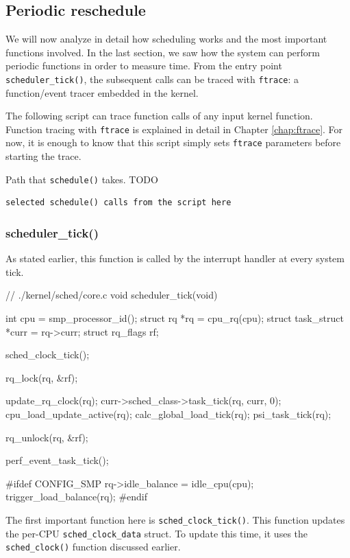 \subsection{Periodic reschedule}
We will now analyze in detail how scheduling works and the most important functions involved. In the last section, we saw how the system can perform periodic functions in order to measure time. From the entry point \verb|scheduler_tick()|, the subsequent calls can be traced with \verb|ftrace|: a function/event tracer embedded in the kernel.

The following script can trace function calls of any input kernel function. Function tracing with \verb|ftrace| is explained in detail in Chapter \ref{chap:ftrace}. For now, it is enough to know that this script simply sets \verb|ftrace| parameters before starting the trace. 

Path that \verb|schedule()| takes. TODO
\begin{Verbatim}
selected schedule() calls from the script here
\end{Verbatim}

\subsubsection{scheduler\_tick()}
As stated earlier, this function is called by the interrupt handler at every system tick.

\begin{code}
// ./kernel/sched/core.c
void scheduler_tick(void)
{
	int cpu = smp_processor_id();
	struct rq *rq = cpu_rq(cpu);
	struct task_struct *curr = rq->curr;
	struct rq_flags rf;

	sched_clock_tick();

	rq_lock(rq, &rf);

	update_rq_clock(rq);
	curr->sched_class->task_tick(rq, curr, 0);
	cpu_load_update_active(rq);
	calc_global_load_tick(rq);
	psi_task_tick(rq);

	rq_unlock(rq, &rf);

	perf_event_task_tick();

#ifdef CONFIG_SMP
	rq->idle_balance = idle_cpu(cpu);
	trigger_load_balance(rq);
#endif
}
\end{code}
The first important function here is \verb|sched_clock_tick()|. This function updates the per-CPU \verb|sched_clock_data| struct. To update this time, it uses the \verb|sched_clock()| function discussed earlier.

